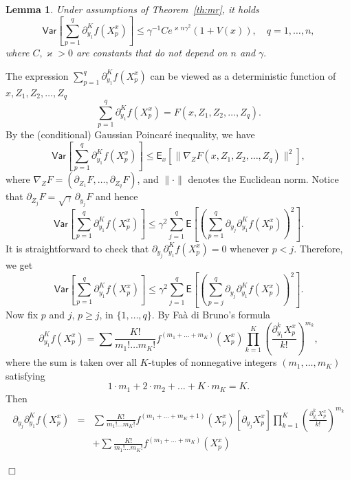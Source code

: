 \documentclass[bj]{imsart}
\newcommand{\proofendsign}{$\Box$}
\newtheorem{lem}[thm]{Lemma}
\newenvironment{proof}{{\noindent \bf Proof }}
 {{\hspace*{\fill}\proofendsign\par\bigskip}}
\begin{document}
\begin{lem}
\label{lem:var_poincare}
Under assumptions of Theorem~\ref{th:mr}, it holds 
$$
\mathsf{Var}\left[\sum_{p=1}^{q}\partial_{y_{1}}^{K}f\left(X_{p}^x\right)\right]\le  \gamma^{-1} C e^{\varkappa n\gamma^2}(1+V(x)), \quad q=1,\ldots,n,
$$
where $C,\varkappa>0$ are constants that do not depend on $n$ and $\gamma.$ 
\end{lem}
\begin{proof}
The expression
$\sum_{p=1}^q \partial_{y_1}^K f(X_p^x)$
can be viewed as a deterministic function of
$x,Z_1,Z_{2},\ldots,Z_q$
$$
\sum_{p=1}^q  \partial_{y_1}^K f(X_p^x)
=F(x,Z_1,Z_{2},\ldots,Z_q).
$$
By the (conditional) Gaussian Poincar\'e inequality,
we have
$$
\mathsf{Var}\left[\sum_{p=1}^{q}\partial_{y_{1}}^{K}f\left(X_{p}^x\right)\right]
\le\mathsf E_x\left[
\|\nabla_Z F(x,Z_1,Z_{2},\ldots,Z_q)\|^2
\right],
$$
where $\nabla_Z F=(\partial_{Z_1} F,\ldots,\partial_{Z_q} F)$,
and $\|\cdot\|$ denotes the Euclidean norm.
Notice that \(\partial_{Z_j} F=\sqrt{\gamma}\,\partial_{y_j} F\) and
hence
$$
\mathsf{Var}\left[\sum_{p=1}^{q}\partial_{y_{1}}^{K}f\left(X_{p}^x\right)\right]\leq\gamma^2\sum_{j=1}^{q}\mathsf{E}\left[\left(\sum_{p=1}^{q}\partial_{y_{j}}\partial_{y_{1}}^{K}f\left(X_{p}^x\right)\right)^{2}\right].
$$
It is straightforward to check that
$\partial_{y_j}\partial_{y_1}^K f(X_p^x)=0$
whenever $p<j$. Therefore, we get
\begin{equation}\label{eq:10062018a2}
\mathsf{Var}\left[\sum_{p=1}^{q}\partial_{y_{1}}^{K}f\left(X_{p}^x\right)\right]\leq\gamma^2\sum_{j=1}^{q}\mathsf{E}\left[\left(\sum_{p=j}^{q}\partial_{y_{j}}\partial_{y_{1}}^{K}f\left(X_{p}^x\right)\right)^{2}\right].
\end{equation}
Now fix $p$ and $j$, $p\ge j$, in $\{1,\ldots,q\}$.
By Fa\`a di Bruno's formula
\[
\partial_{y_{1}}^{K}f\left(X_{p}^x\right)=\sum\frac{K!}{m_{1}!\ldots m_{K}!}f^{(m_{1}+\ldots+m_{K})}(X_{p}^x)\prod_{k=1}^{K}\left(\frac{\partial_{y_{1}}^{k}X^x_{p}}{k!}\right)^{m_{k}},
\]
where the sum is taken over all $K$-tuples of nonnegative integers
$(m_1,\ldots,m_K)$ satisfying
$$
1\cdot m_{1}+2\cdot m_{2}+\ldots+K\cdot m_{K}=K.
$$
Then
\begin{eqnarray*}
\partial_{y_{j}}\partial_{y_{1}}^{K}f\left(X_{p}^x\right)
&=&\sum\frac{K!}{m_{1}!\ldots m_{K}!}f^{(m_{1}+\ldots+m_{K}+1)}(X^x_{p})\left[\partial_{y_{j}}X^x_{p}\right]\prod_{k=1}^{K}\left(\frac{\partial_{y_{1}}^{k}X_{p}^x}{k!}\right)^{m_{k}} \\
&&+\sum\frac{K!}{m_{1}!\ldots m_{K}!}f^{(m_{1}+\ldots+m_{K})}(X^x_{p})

\end{eqnarray*}
\end{proof}
\end{document}
